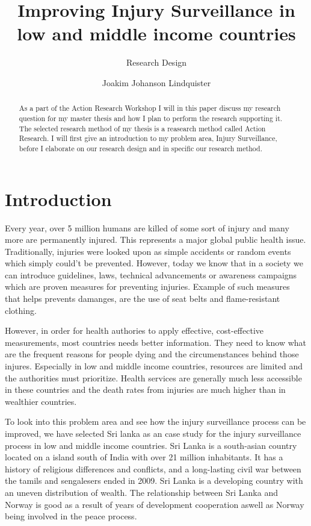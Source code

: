 \documentclass[UKenglish, 12pt]{article}
\title{Improving Injury Surveillance in low and middle income countries}
\subtitle{Research Design}
\author{Joakim Johanson Lindquister}
\begin{document}
\ififorside{}

\begin{abstract}
As a part of the Action Research Workshop I will in this paper discuss my research question for my master thesis and how I plan to perform the research supporting it. The selected research method of my thesis is a reasearch method called Action Research. I will first give an introduction to my problem area, Injury Surveillance, before I elaborate on our research design and in specific our research method.
\end{abstract}

\section*{Introduction} 
Every year, over 5 million humans are killed of some sort of injury and many more are permanently injured\cite[page~12]{who-guide}. This represents a major global public health issue. Traditionally, injuries were looked upon as simple accidents or random events which simply could't be prevented. However, today we know that in a society we can introduce guidelines, laws, technical advancements or awareness campaigns which are proven measures for preventing injuries. Example of such measures that helps prevents damanges, are the use of seat belts and flame-resistant clothing.

However, in order for health authories to apply effective, cost-effective measurements, most countries needs better information. They need to know what are the frequent reasons for people dying and the circumenstances behind those injures. Especially in low and middle income countries, resources are limited and the authorities must prioritize. Health services are generally much less accessible in these countries and the death rates from injuries are much higher than in wealthier countries.

To look into this problem area and see how the injury surveillance process can be improved, we have selected Sri lanka as an case study for the injury surveillance process in low and middle income countries. Sri Lanka is a south-asian country located on a island south of India with over 21 million inhabitants\cite{snl-sri-lanka}. It has a history of religious differences and conflicts, and a long-lasting civil war between the tamils and sengalesers ended in 2009. Sri Lanka is a developing country with an uneven distribution of wealth. The relationship between Sri Lanka and Norway is good as a result of years of development cooperation aswell as Norway being involved in the peace process\cite{udep-sri-lanka}. \\
\end{document}
